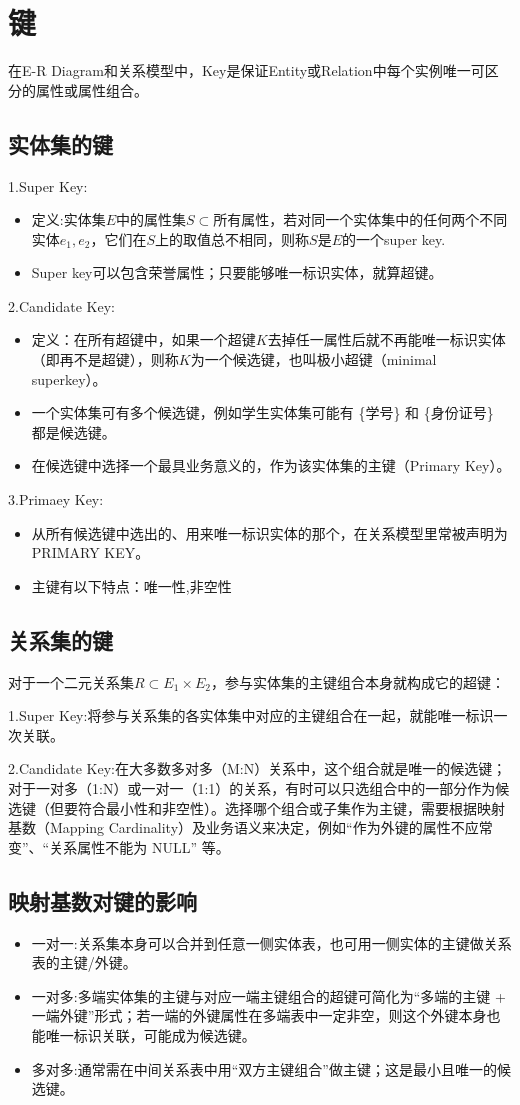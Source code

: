 \section{键}

在E-R Diagram和关系模型中，Key是保证Entity或Relation中每个实例唯一可区分的属性或属性组合。

\subsection{实体集的键}

1.Super Key:
\begin{itemize}
    \item 定义:实体集$E$中的属性集$S\subset$所有属性，若对同一个实体集中的任何两个不同实体$e_1,e_2$，它们在$S$上的取值总不相同，则称$S$是$E$的一个super key.
    \item Super key可以包含荣誉属性；只要能够唯一标识实体，就算超键。
\end{itemize}

2.Candidate Key:
\begin{itemize}
    \item 定义：在所有超键中，如果一个超键$K$去掉任一属性后就不再能唯一标识实体（即再不是超键），则称$K$为一个候选键，也叫极小超键（minimal superkey）。
    \item 一个实体集可有多个候选键，例如学生实体集可能有 \{学号\} 和 \{身份证号\} 都是候选键。
    \item 在候选键中选择一个最具业务意义的，作为该实体集的主键（Primary Key）。
\end{itemize}

3.Primaey Key:
\begin{itemize}
    \item 从所有候选键中选出的、用来唯一标识实体的那个，在关系模型里常被声明为 PRIMARY KEY。
    \item 主键有以下特点：唯一性,非空性
\end{itemize}

\subsection{关系集的键}

对于一个二元关系集$R\subset E_1\times E_2$，参与实体集的主键组合本身就构成它的超键：

1.Super Key:将参与关系集的各实体集中对应的主键组合在一起，就能唯一标识一次关联。

2.Candidate Key:在大多数多对多（M:N）关系中，这个组合就是唯一的候选键；对于一对多（1:N）或一对一（1:1）的关系，有时可以只选组合中的一部分作为候选键（但要符合最小性和非空性）。选择哪个组合或子集作为主键，需要根据映射基数（Mapping Cardinality）及业务语义来决定，例如“作为外键的属性不应常变”、“关系属性不能为 NULL” 等。

\subsection{映射基数对键的影响}

\begin{itemize}
    \item 一对一:关系集本身可以合并到任意一侧实体表，也可用一侧实体的主键做关系表的主键/外键。
    \item 一对多:多端实体集的主键与对应一端主键组合的超键可简化为“多端的主键 + 一端外键”形式；若一端的外键属性在多端表中一定非空，则这个外键本身也能唯一标识关联，可能成为候选键。
    \item 多对多:通常需在中间关系表中用“双方主键组合”做主键；这是最小且唯一的候选键。
\end{itemize}